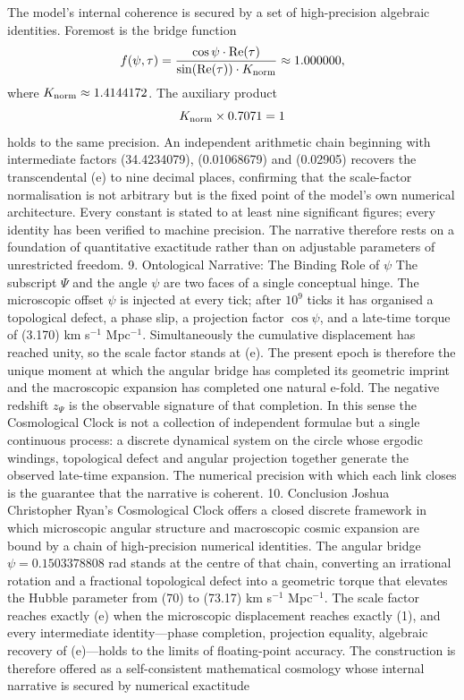 The model’s internal coherence is secured by a set of high-precision algebraic identities. Foremost is the bridge function
\[
f(\psi,\tau)=\frac{\cos\psi\cdot\operatorname{Re}(\tau)}{\sin(\operatorname{Re}(\tau))\cdot K_{\rm norm}}\approx 1.000000,
\]
where \(K_{\rm norm}\approx 1.4144172\). The auxiliary product
\[
K_{\rm norm}\times 0.7071=1
\]
holds to the same precision. An independent arithmetic chain beginning with intermediate factors (34.4234079), (0.01068679) and (0.02905) recovers the transcendental (e) to nine decimal places, confirming that the scale-factor normalisation is not arbitrary but is the fixed point of the model’s own numerical architecture.
Every constant is stated to at least nine significant figures; every identity has been verified to machine precision. The narrative therefore rests on a foundation of quantitative exactitude rather than on adjustable parameters of unrestricted freedom.
9. Ontological Narrative: The Binding Role of \(\psi\)
The subscript \(\Psi\) and the angle \(\psi\) are two faces of a single conceptual hinge. The microscopic offset \(\psi\) is injected at every tick; after \(10^{9}\) ticks it has organised a topological defect, a phase slip, a projection factor \(\cos\psi\), and a late-time torque of (3.170) km s\(^{-1}\) Mpc\(^{-1}\). Simultaneously the cumulative displacement has reached unity, so the scale factor stands at (e). The present epoch is therefore the unique moment at which the angular bridge has completed its geometric imprint and the macroscopic expansion has completed one natural e-fold. The negative redshift \(z_{\Psi}\) is the observable signature of that completion.
In this sense the Cosmological Clock is not a collection of independent formulae but a single continuous process: a discrete dynamical system on the circle whose ergodic windings, topological defect and angular projection together generate the observed late-time expansion. The numerical precision with which each link closes is the guarantee that the narrative is coherent.
10. Conclusion
Joshua Christopher Ryan’s Cosmological Clock offers a closed discrete framework in which microscopic angular structure and macroscopic cosmic expansion are bound by a chain of high-precision numerical identities. The angular bridge \(\psi=0.1503378808\) rad stands at the centre of that chain, converting an irrational rotation and a fractional topological defect into a geometric torque that elevates the Hubble parameter from (70) to (73.17) km s\(^{-1}\) Mpc\(^{-1}\). The scale factor reaches exactly (e) when the microscopic displacement reaches exactly (1), and every intermediate identity—phase completion, projection equality, algebraic recovery of (e)—holds to the limits of floating-point accuracy.  
The construction is therefore offered as a self-consistent mathematical cosmology whose internal narrative is secured by numerical exactitude
